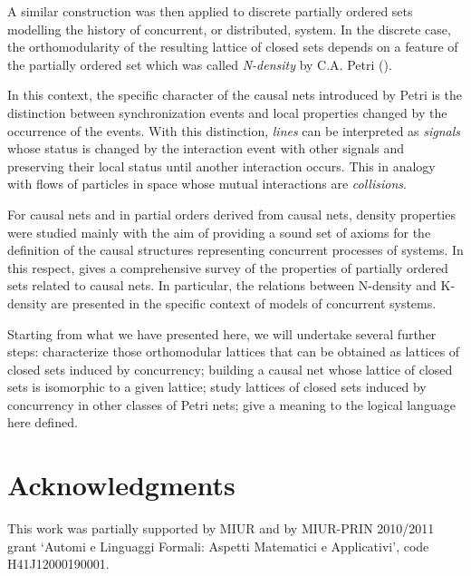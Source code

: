 \documentclass{eptcs}
\begin{document}
A similar construction was then applied to discrete partially
ordered sets modelling the history of concurrent, or
distributed, system. In the discrete case, the orthomodularity
of the resulting lattice of closed sets depends on a feature
of the partially ordered set which was called
\emph{N-density} by C.A. Petri (\cite{BPR10}).

In this context, the specific character of the causal nets
introduced by Petri is the distinction between synchronization events
and local properties changed by the occurrence of the events. With
this distinction, \emph{lines} can be interpreted as \emph{signals}
whose status is changed by the interaction event with other signals
and preserving their local status until another interaction
occurs. This in analogy with flows of particles in space whose mutual
interactions are \emph{collisions}.

For causal nets and in partial orders derived from causal nets,
density properties were studied mainly with the aim of providing
a sound set of axioms for the definition of the causal structures
representing concurrent processes of systems.
In this respect, \cite{BF88} gives a
comprehensive survey of the properties of partially ordered sets
related to causal nets. In particular, the relations between
N-density and K-density
are presented in the specific context of models of concurrent systems.

Starting from what we have presented here, we will undertake
several further steps: characterize those orthomodular lattices that can
be obtained as lattices of closed sets induced by concurrency;
building a causal net whose lattice of closed sets is
isomorphic to a given lattice; study lattices of closed sets
induced by concurrency in other classes of Petri nets;
give a meaning to the logical language here defined.
\section*{Acknowledgments}
This work was partially supported by MIUR and by
MIUR-PRIN 2010/2011 grant `Automi e Linguaggi Formali:
Aspetti Matematici e Applicativi', code H41J12000190001.


\end{document}
